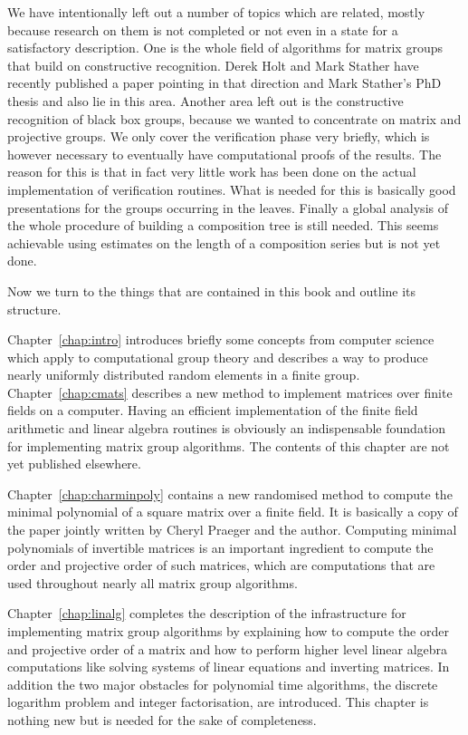 We have intentionally left out a number of topics which are related, mostly
because research on them is not completed or not even in a state for a
satisfactory description. One is
the whole field of algorithms for matrix groups that build on constructive
recognition. Derek Holt and Mark Stather have recently published a paper
\cite{HoltStather} pointing in that direction and Mark Stather's PhD thesis
\cite{StatherPhd} and \cite{StatherSylow} also lie in this area. 
Another area left out is the
constructive recognition of black box groups, because we wanted to
concentrate on matrix and projective groups. We only cover the
verification phase very briefly, which is however necessary to eventually
have computational proofs of the results. The reason for this is that in
fact very little work has been done on the actual implementation of
verification routines. What is needed for this is basically good
presentations for the groups occurring in the leaves. 
Finally a global analysis of the
whole procedure of building a composition tree is still needed. This seems
achievable using estimates on the length of a composition series but is not
yet done.

Now we turn to the things that are contained in this book and
outline its structure. 

Chapter~\ref{chap:intro} introduces briefly some concepts from computer
science which apply to computational group theory and describes a
way to produce nearly uniformly distributed random elements in a
finite group. Chapter~\ref{chap:cmats} describes a new method to
implement matrices over finite fields on a computer. Having an efficient
implementation of the finite field arithmetic and linear algebra
routines is obviously an indispensable foundation for implementing
matrix group algorithms. The contents of this chapter are not yet
published elsewhere.

Chapter~\ref{chap:charminpoly} contains a new randomised method to
compute the minimal polynomial of a square matrix over a finite field.
It is basically a copy of the paper \cite{minpolypaper} jointly
written by Cheryl Praeger and the author. Computing minimal
polynomials of invertible matrices is an important ingredient to compute the
order and projective order of such matrices, which are computations
that are used throughout nearly all matrix group algorithms.

Chapter~\ref{chap:linalg} completes the description of the
infrastructure for implementing matrix group algorithms by explaining
how to compute the order and projective order of a matrix and how to
perform higher level linear algebra computations like solving systems
of linear equations and inverting matrices. In addition the two
major obstacles for polynomial time algorithms, the discrete logarithm
problem and integer factorisation, are introduced. This chapter is
nothing new but is needed for the sake of completeness.

